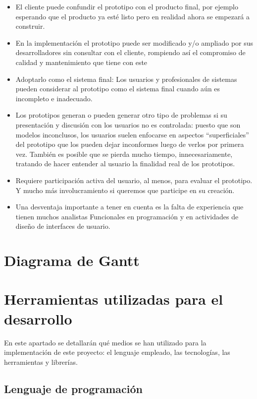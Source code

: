 \begin{itemize}
    \item El cliente puede confundir el prototipo con el producto final, por ejemplo esperando que el producto ya esté listo pero en realidad ahora se empezará a construir.
    \item En la implementación el prototipo puede ser modificado y/o ampliado por sus desarrolladores sin consultar con el cliente, rompiendo así el compromiso de calidad y mantenimiento que tiene con este
    \item Adoptarlo como el sistema final: Los usuarios y profesionales de sistemas pueden considerar al prototipo como el sistema final cuando aún es incompleto e inadecuado.
    \item Los prototipos generan o pueden generar otro tipo de problemas si su presentación y discusión con los usuarios no es controlada: puesto que son modelos inconclusos, los usuarios suelen enfocarse en aspectos “superficiales” del prototipo que los pueden dejar inconformes luego de verlos por primera vez. También es posible que se pierda mucho tiempo, innecesariamente, tratando de hacer entender al usuario la finalidad real de los prototipos.
    \item Requiere participación activa del usuario, al menos, para evaluar el prototipo. Y mucho más involucramiento si queremos que participe en su creación.
    \item Una desventaja importante a tener en cuenta es la falta de experiencia que tienen muchos analistas Funcionales en programación y en actividades de diseño de interfaces de usuario.
\end{itemize}

\section{Diagrama de Gantt}

\section{Herramientas utilizadas para el desarrollo}

En este apartado se detallarán qué medios se han utilizado para la implementación de este proyecto: el lenguaje empleado, las tecnologías, las herramientas y librerías. 
\subsection{Lenguaje de programación} 

